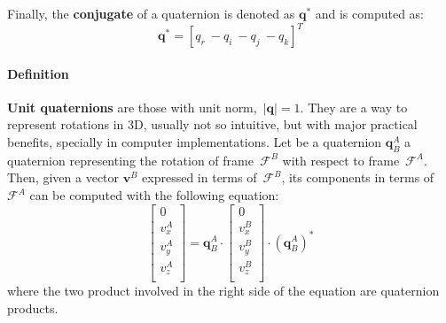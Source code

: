 Finally, the \textbf{conjugate} of a quaternion is denoted as $\mathbf{q}^*$ and is computed as:
\begin{equation}
 \mathbf{q}^* = [q_r\ -q_i\ -q_j\ -q_k]^T
\end{equation}


\paragraph{Definition} \textbf{Unit quaternions} are those with unit norm,~$|\mathbf{q}|=1$. They are a way to represent rotations in 3D, usually not so intuitive, but with major practical benefits, specially in computer implementations. Let be a quaternion $\mathbf{q}^A_B$ a quaternion representing the rotation of frame~$\mathcal{F}^B$ with respect to frame~$\mathcal{F}^A$. Then, given a vector $\mathbf{v}^B$ expressed in terms of~$\mathcal{F}^B$, its components in terms of~$\mathcal{F}^A$ can be computed with the following equation: 
\begin{equation}
\left[
 \begin{array}{c}
 0\\
 v^A_x\\
 v^A_y\\
 v^A_z\\
 \end{array}
 \right] 
 =
 \mathbf{q}^A_B
 \cdot
 \left[
 \begin{array}{c}
 0\\
 v^B_x\\
 v^B_y\\
 v^B_z\\
 \end{array}
 \right]
 \cdot
 (\mathbf{q}^A_B)^*
\end{equation}
where the two product involved in the right side of the equation are quaternion products.  

